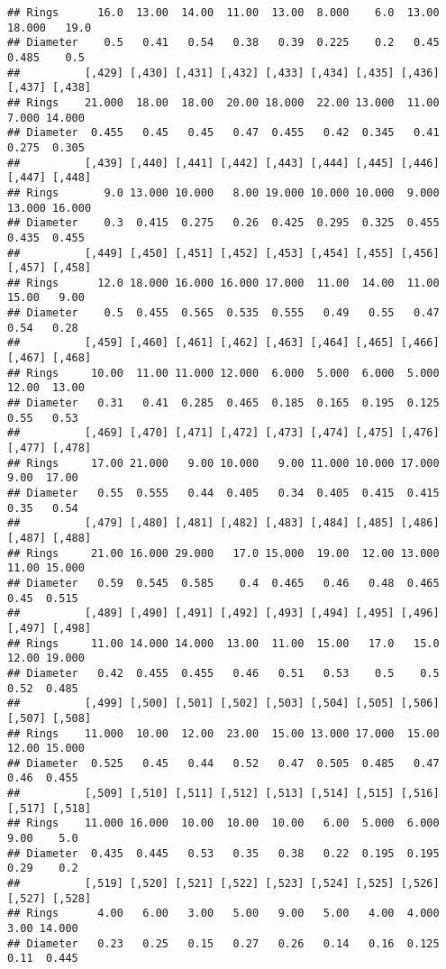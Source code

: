 \documentclass[
]{article}
\begin{document}
\begin{verbatim}
## Rings      16.0  13.00  14.00  11.00  13.00  8.000    6.0  13.00 18.000   19.0
## Diameter    0.5   0.41   0.54   0.38   0.39  0.225    0.2   0.45  0.485    0.5
##          [,429] [,430] [,431] [,432] [,433] [,434] [,435] [,436] [,437] [,438]
## Rings    21.000  18.00  18.00  20.00 18.000  22.00 13.000  11.00  7.000 14.000
## Diameter  0.455   0.45   0.45   0.47  0.455   0.42  0.345   0.41  0.275  0.305
##          [,439] [,440] [,441] [,442] [,443] [,444] [,445] [,446] [,447] [,448]
## Rings       9.0 13.000 10.000   8.00 19.000 10.000 10.000  9.000 13.000 16.000
## Diameter    0.3  0.415  0.275   0.26  0.425  0.295  0.325  0.455  0.435  0.455
##          [,449] [,450] [,451] [,452] [,453] [,454] [,455] [,456] [,457] [,458]
## Rings      12.0 18.000 16.000 16.000 17.000  11.00  14.00  11.00  15.00   9.00
## Diameter    0.5  0.455  0.565  0.535  0.555   0.49   0.55   0.47   0.54   0.28
##          [,459] [,460] [,461] [,462] [,463] [,464] [,465] [,466] [,467] [,468]
## Rings     10.00  11.00 11.000 12.000  6.000  5.000  6.000  5.000  12.00  13.00
## Diameter   0.31   0.41  0.285  0.465  0.185  0.165  0.195  0.125   0.55   0.53
##          [,469] [,470] [,471] [,472] [,473] [,474] [,475] [,476] [,477] [,478]
## Rings     17.00 21.000   9.00 10.000   9.00 11.000 10.000 17.000   9.00  17.00
## Diameter   0.55  0.555   0.44  0.405   0.34  0.405  0.415  0.415   0.35   0.54
##          [,479] [,480] [,481] [,482] [,483] [,484] [,485] [,486] [,487] [,488]
## Rings     21.00 16.000 29.000   17.0 15.000  19.00  12.00 13.000  11.00 15.000
## Diameter   0.59  0.545  0.585    0.4  0.465   0.46   0.48  0.465   0.45  0.515
##          [,489] [,490] [,491] [,492] [,493] [,494] [,495] [,496] [,497] [,498]
## Rings     11.00 14.000 14.000  13.00  11.00  15.00   17.0   15.0  12.00 19.000
## Diameter   0.42  0.455  0.455   0.46   0.51   0.53    0.5    0.5   0.52  0.485
##          [,499] [,500] [,501] [,502] [,503] [,504] [,505] [,506] [,507] [,508]
## Rings    11.000  10.00  12.00  23.00  15.00 13.000 17.000  15.00  12.00 15.000
## Diameter  0.525   0.45   0.44   0.52   0.47  0.505  0.485   0.47   0.46  0.455
##          [,509] [,510] [,511] [,512] [,513] [,514] [,515] [,516] [,517] [,518]
## Rings    11.000 16.000  10.00  10.00  10.00   6.00  5.000  6.000   9.00    5.0
## Diameter  0.435  0.445   0.53   0.35   0.38   0.22  0.195  0.195   0.29    0.2
##          [,519] [,520] [,521] [,522] [,523] [,524] [,525] [,526] [,527] [,528]
## Rings      4.00   6.00   3.00   5.00   9.00   5.00   4.00  4.000   3.00 14.000
## Diameter   0.23   0.25   0.15   0.27   0.26   0.14   0.16  0.125   0.11  0.445

\end{verbatim}
\end{document}
